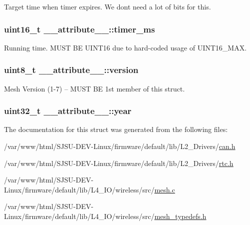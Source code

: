 Target time when timer expires. We don\textquotesingle{}t need a lot of bits for this. 

\subsubsection[{\texorpdfstring{timer\+\_\+ms}{timer_ms}}]{\setlength{\rightskip}{0pt plus 5cm}uint16\+\_\+t \+\_\+\+\_\+attribute\+\_\+\+\_\+\+::timer\+\_\+ms}\hypertarget{struct____attribute_____a029c6f0fb55fdad96770454f90e12ce1}{}\label{struct____attribute_____a029c6f0fb55fdad96770454f90e12ce1}


Running time. M\+U\+ST BE U\+I\+N\+T16 due to hard-\/coded usage of U\+I\+N\+T16\+\_\+\+M\+AX. 

\subsubsection[{\texorpdfstring{version}{version}}]{\setlength{\rightskip}{0pt plus 5cm}uint8\+\_\+t \+\_\+\+\_\+attribute\+\_\+\+\_\+\+::version}\hypertarget{struct____attribute_____a2e226654212aebfb764a8df90d66b006}{}\label{struct____attribute_____a2e226654212aebfb764a8df90d66b006}


Mesh Version (1-\/7) -- M\+U\+ST BE 1st member of this struct. 

\subsubsection[{\texorpdfstring{year}{year}}]{\setlength{\rightskip}{0pt plus 5cm}uint32\+\_\+t \+\_\+\+\_\+attribute\+\_\+\+\_\+\+::year}\hypertarget{struct____attribute_____afb5fa3b09ae735aea92d1a6fa1c6c1c6}{}\label{struct____attribute_____afb5fa3b09ae735aea92d1a6fa1c6c1c6}


The documentation for this struct was generated from the following files\+:\begin{DoxyCompactItemize}
\item 
/var/www/html/\+S\+J\+S\+U-\/\+D\+E\+V-\/\+Linux/firmware/default/lib/\+L2\+\_\+\+Drivers/\hyperlink{can_8h}{can.\+h}\item 
/var/www/html/\+S\+J\+S\+U-\/\+D\+E\+V-\/\+Linux/firmware/default/lib/\+L2\+\_\+\+Drivers/\hyperlink{rtc_8h}{rtc.\+h}\item 
/var/www/html/\+S\+J\+S\+U-\/\+D\+E\+V-\/\+Linux/firmware/default/lib/\+L4\+\_\+\+I\+O/wireless/src/\hyperlink{mesh_8c}{mesh.\+c}\item 
/var/www/html/\+S\+J\+S\+U-\/\+D\+E\+V-\/\+Linux/firmware/default/lib/\+L4\+\_\+\+I\+O/wireless/src/\hyperlink{mesh__typedefs_8h}{mesh\+\_\+typedefs.\+h}\end{DoxyCompactItemize}
